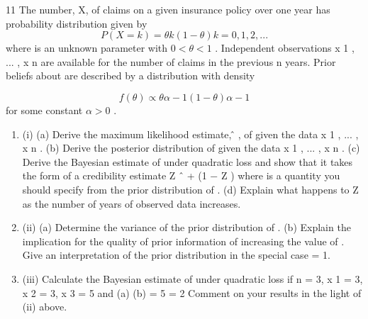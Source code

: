 \documentclass[a4paper,12pt]{article}
\begin{document}
\begin{enumerate}

11
The number, X, of claims on a given insurance policy over one year has probability
distribution given by
\[ P ( X = k ) = \theta  k (1 − \theta  ) k = 0, 1, 2, ...\]
where \theta  is an unknown parameter with $0 < \theta  < 1$ .
Independent observations x 1 , ... , x n are available for the number of claims in the
previous n years. Prior beliefs about \theta  are described by a distribution with density

\[ f ( \theta  ) ∝ \theta  \alpha − 1 (1 − \theta  ) \alpha − 1\]
for some constant $\alpha  > 0$ .

\begin{enumerate}
\item (i)
(a) Derive the maximum likelihood estimate, \theta ̂ , of \theta  given the data
x 1 , ... , x n .
(b) Derive the posterior distribution of \theta  given the data x 1 , ... , x n .
(c) Derive the Bayesian estimate of \theta  under quadratic loss and show that
it takes the form of a credibility estimate
Z \theta  ˆ + (1 − Z ) \mu 
where \mu  is a quantity you should specify from the prior distribution of
\theta .
(d)
Explain what happens to Z as the number of years of observed data
increases.

\item (ii)
(a) Determine the variance of the prior distribution of \theta .
(b) Explain the implication for the quality of prior information of
increasing the value of \alpha . Give an interpretation of the prior
distribution in the special case \alpha  = 1.

\item (iii)
Calculate the Bayesian estimate of \theta  under quadratic loss if n = 3,
x 1 = 3, x 2 = 3, x 3 = 5 and
(a)
(b)
\alpha  = 5
\alpha  = 2
Comment on your results in the light of (ii) above.
\end{enumerate}
\newpage


\end{enumerate}
\end{document}
